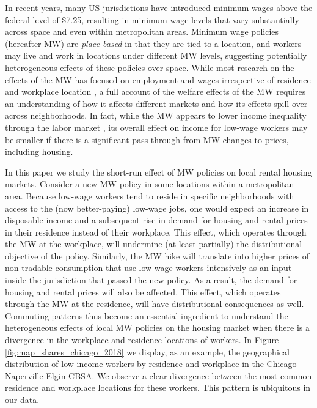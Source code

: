 

In recent years, many US jurisdictions have introduced minimum wages above the 
federal level of \$7.25, resulting in minimum wage levels that vary 
substantially across space and even within metropolitan areas.
Minimum wage policies (hereafter MW) are \textit{place-based} in that they are 
tied to a location, and workers may live and work in locations under different 
MW levels, suggesting potentially heterogeneous effects of these policies over
space.
While most research on the effects of the MW has focused on employment and 
wages irrespective of residence and workplace location
\parencite[e.g.,][]{CardKrueger1994, CegnizEtAl2019},
a full account of the welfare effects of the MW requires an understanding of 
how it affects different markets and how its effects spill over across 
neighborhoods.
In fact, while the MW appears to lower income inequality through the labor 
market \parencite{Lee1999, AutorEtAl2016},
its overall effect on income for low-wage workers may be smaller if there is 
a significant pass-through from MW changes to prices, including housing.

In this paper we study the short-run effect of MW policies on local rental 
housing markets.
Consider a new MW policy in some locations within a metropolitan area.
Because low-wage workers tend to reside in specific neighborhoods with access 
to the (now better-paying) low-wage jobs,
one would expect an increase in disposable income and a subsequent rise in demand 
for housing and rental prices in their residence instead of their workplace.
This effect, which operates through the MW at the workplace, 
will undermine (at least partially) the distributional objective of the policy.
Similarly, the MW hike will translate into higher prices of non-tradable 
consumption that use low-wage workers intensively as an input inside the 
jurisdiction that passed the new policy.
As a result, the demand for housing and rental prices will also be affected.
This effect, which operates through the MW at the residence, will have 
distributional consequences as well.
Commuting patterns thus become an essential ingredient to understand the 
heterogeneous effects of local MW policies on the housing market when there 
is a divergence in the workplace and residence locations of workers.
In Figure \ref{fig:map_shares_chicago_2018} we display, as an example, the 
geographical distribution of low-income workers by residence and workplace in 
the Chicago-Naperville-Elgin CBSA.
We observe a clear divergence between the most common residence and workplace 
locations for these workers.
This pattern is ubiquitous in our data. 

